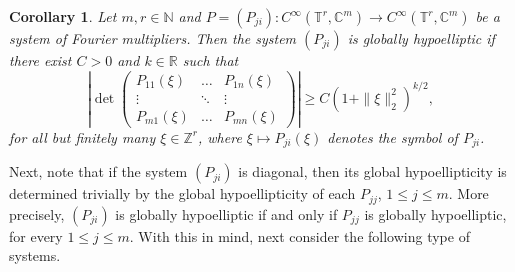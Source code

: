 \documentclass[11pt]{amsart}
\numberwithin{theorem}{section}
\numberwithin{equation}{section}
\newtheorem{corollary}[theorem]{Corollary}
\theoremstyle{definition}
\numberwithin{example}{section}
\theoremstyle{definition}
\theoremstyle{definition}
\newcommand{\R}{\mathbb{R}}
\newcommand{\Z}{\mathbb{Z}}
\newcommand{\N}{\mathbb{N}}
\newcommand{\T}{\mathbb{T}}
\begin{document}
\begin{corollary}
    Let $m,r\in\N$ and $P=(P_{ji}):C^\infty(\T^r,\mathbb{C}^m)\to C^\infty(\T^r,\mathbb{C}^m)$ be a system of Fourier multipliers. Then the system $(P_{ji})$ is globally hypoelliptic if there exist $C>0$ and $k\in\R$ such that
    \begin{equation*}
        \left|\det \begin{pmatrix}
        {P_{11}}(\xi)&\dots &{P_{1n}}(\xi)\\
        \vdots&\ddots&\vdots\\
         {P_{m1}}(\xi)&\dots &{P_{mn}}(\xi)
    \end{pmatrix}\right|\geq C(1+\|\xi\|_2^2)^{k/2},
    \end{equation*}
    for all but finitely many $\xi\in\Z^r$, where $\xi\mapsto P_{ji}(\xi)$ denotes the symbol of $P_{ji}$.
\end{corollary}

Next, note that if the system $(P_{ji})$ is diagonal, then its global hypoellipticity is determined trivially by the global hypoellipticity of each $P_{jj}$, $1\leq j\leq m$. More precisely, $(P_{ji})$ is globally hypoelliptic if and only if $P_{jj}$ is globally hypoelliptic, for every $1\leq j\leq m$. With this in mind, next consider the following type of systems.
\end{document}
